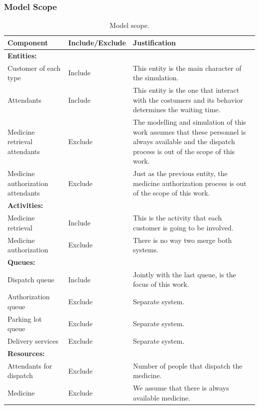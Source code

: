 \subsubsection{Model Scope}
\begin{table}[H]
\centering
\begin{tabular}{p{3cm}lp{6cm}}
\hline
\textbf{Component}                                  & \textbf{Include/Exclude} & \textbf{Justification}\\ \hline
\textbf{Entities:}&&
\\
Customer of each type                      & Include         & This entity is the main character of the simulation.                                                                                                                                             \\
Attendants                                 & Include         & This entity is the one that interact with the costumers and its behavior determines the waiting time.                                                                                           \\
Medicine retrieval attendants & Exclude         & The modelling and simulation of this work assumes that these personnel is always available and the dispatch process is out of the scope of this work. \\
Medicine \mbox{authorization} attendants          & Exclude         & Just as the previous entity, the medicine authorization process is out of the scope of this work.                                                                                                \\\hline
\textbf{Activities:}&&\\
Medicine retrieval     & Include         & This is the activity that each customer is going to be involved. \\
Medicine \mbox{authorization} & Exclude         & There is no way two merge both systems.                          \\ \hline

\textbf{Queues:}&&\\

Dispatch queue      & Include         & Jointly with the last queue, is the focus of this work. \\
Authorization queue & Exclude         & Separate system.                                        \\
Parking lot queue   & Exclude         & Separate system.                                        \\
Delivery services   & Exclude         & Separate system.                                        \\ \hline
\textbf{Resources:}\\
Attendants for \mbox{dispatch} & Exclude         & Number of people that dispatch the medicine.       \\
Medicine               & Exclude         & We assume that there is always available medicine. \\ \hline
\end{tabular}
\caption{Model scope.}
\label{tab:model_scope}
\end{table}

